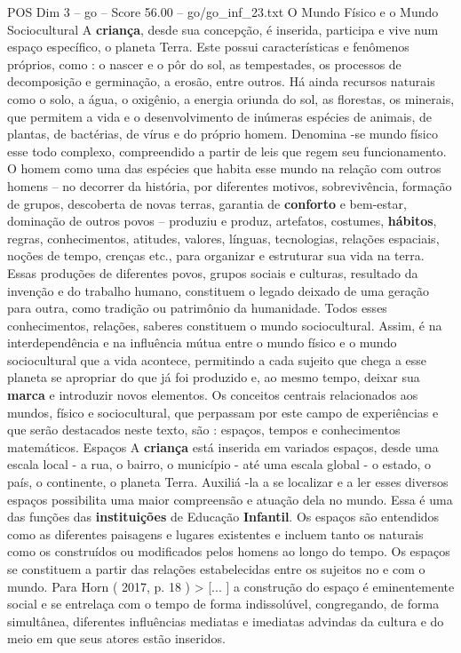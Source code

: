 \begin{textsample}{POS Dim 3 – go – Score 56.00 – go/go\_inf\_23.txt}
O Mundo Físico e o Mundo Sociocultural A \textbf{criança}, desde sua concepção, é inserida, participa e vive num espaço específico, o planeta Terra.
Este possui características e fenômenos próprios, como : o nascer e o pôr do sol, as tempestades, os processos de decomposição e germinação, a erosão, entre outros.
Há ainda recursos naturais como o solo, a água, o oxigênio, a energia oriunda do sol, as florestas, os minerais, que permitem a vida e o desenvolvimento de inúmeras espécies de animais, de plantas, de bactérias, de vírus e do próprio homem.
Denomina -se mundo físico esse todo complexo, compreendido a partir de leis que regem seu funcionamento.
O homem como uma das espécies que habita esse mundo na relação com outros homens – no decorrer da história, por diferentes motivos, sobrevivência, formação de grupos, descoberta de novas terras, garantia de \textbf{conforto} e bem-estar, dominação de outros povos – produziu e produz, artefatos, costumes, \textbf{hábitos}, regras, conhecimentos, atitudes, valores, línguas, tecnologias, relações espaciais, noções de tempo, crenças etc., para organizar e estruturar sua vida na terra.
Essas produções de diferentes povos, grupos sociais e culturas, resultado da invenção e do trabalho humano, constituem o legado deixado de uma geração para outra, como tradição ou patrimônio da humanidade.
Todos esses conhecimentos, relações, saberes constituem o mundo sociocultural.
Assim, é na interdependência e na influência mútua entre o mundo físico e o mundo sociocultural que a vida acontece, permitindo a cada sujeito que chega a esse planeta se apropriar do que já foi produzido e, ao mesmo tempo, deixar sua \textbf{marca} e introduzir novos elementos.
Os conceitos centrais relacionados aos mundos, físico e sociocultural, que perpassam por este campo de experiências e que serão destacados neste texto, são : espaços, tempos e conhecimentos matemáticos.
Espaços A \textbf{criança} está inserida em variados espaços, desde uma escala local - a rua, o bairro, o município - até uma escala global - o estado, o país, o continente, o planeta Terra.
Auxiliá -la a se localizar e a ler esses diversos espaços possibilita uma maior compreensão e atuação dela no mundo.
Essa é uma das funções das \textbf{instituições} de Educação \textbf{Infantil}.
Os espaços são entendidos como as diferentes paisagens e lugares existentes e incluem tanto os naturais como os construídos ou modificados pelos homens ao longo do tempo.
Os espaços se constituem a partir das relações estabelecidas entre os sujeitos no e com o mundo.
Para Horn ( 2017, p. 18 ) > [... ] a construção do espaço é eminentemente social e se entrelaça com o tempo de forma indissolúvel, congregando, de forma simultânea, diferentes influências mediatas e imediatas advindas da cultura e do meio em que seus atores estão inseridos.

\end{textsample}
